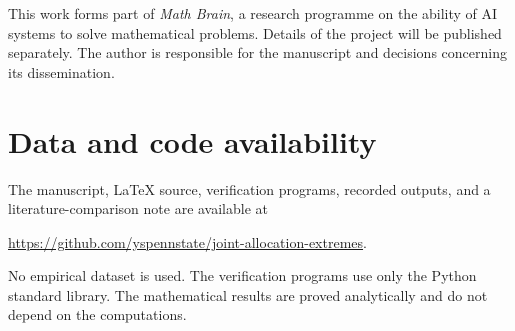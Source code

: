 This work forms part of \emph{Math Brain}, a research programme on the ability of AI systems to solve mathematical problems. Details of the project will be published separately. The author is responsible for the manuscript and decisions concerning its dissemination.

\section*{Data and code availability}
The manuscript, \LaTeX{} source, verification programs, recorded outputs, and a literature-comparison note are available at
\begin{center}
\url{https://github.com/yspennstate/joint-allocation-extremes}.
\end{center}
No empirical dataset is used. The verification programs use only the Python standard library. The mathematical results are proved analytically and do not depend on the computations.

